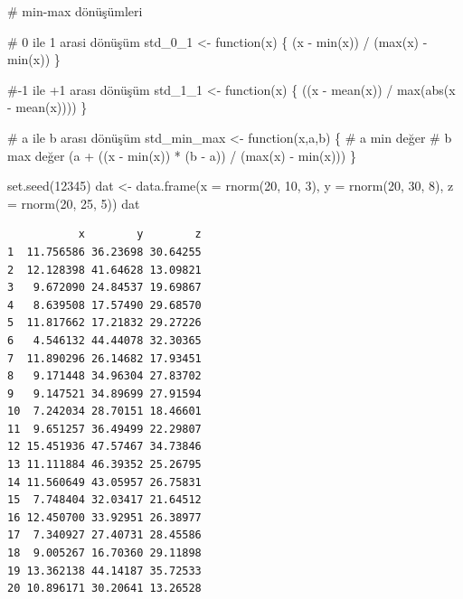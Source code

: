 \documentclass[
  letterpaper,
  DIV=11,
  numbers=noendperiod]{scrreprt}
\newenvironment{Shaded}{\begin{snugshade}}{\end{snugshade}}
\newcommand{\AttributeTok}[1]{\textcolor[rgb]{0.40,0.45,0.13}{#1}}
\newcommand{\CommentTok}[1]{\textcolor[rgb]{0.37,0.37,0.37}{#1}}
\newcommand{\ControlFlowTok}[1]{\textcolor[rgb]{0.00,0.23,0.31}{#1}}
\newcommand{\DecValTok}[1]{\textcolor[rgb]{0.68,0.00,0.00}{#1}}
\newcommand{\FunctionTok}[1]{\textcolor[rgb]{0.28,0.35,0.67}{#1}}
\newcommand{\NormalTok}[1]{\textcolor[rgb]{0.00,0.23,0.31}{#1}}
\newcommand{\OtherTok}[1]{\textcolor[rgb]{0.00,0.23,0.31}{#1}}
\newcommand{\SpecialCharTok}[1]{\textcolor[rgb]{0.37,0.37,0.37}{#1}}
\begin{document}
\begin{Shaded}
\begin{Highlighting}[]
\CommentTok{\# min{-}max dönüşümleri}

\CommentTok{\# 0 ile 1 arasi dönüşüm}
\NormalTok{std\_0\_1 }\OtherTok{\textless{}{-}} \ControlFlowTok{function}\NormalTok{(x) \{}
\NormalTok{  (x }\SpecialCharTok{{-}} \FunctionTok{min}\NormalTok{(x)) }\SpecialCharTok{/}\NormalTok{ (}\FunctionTok{max}\NormalTok{(x) }\SpecialCharTok{{-}} \FunctionTok{min}\NormalTok{(x))}
\NormalTok{\}}

\CommentTok{\#{-}1 ile +1 arası dönüşüm }
\NormalTok{std\_1\_1 }\OtherTok{\textless{}{-}} \ControlFlowTok{function}\NormalTok{(x) \{}
\NormalTok{  ((x }\SpecialCharTok{{-}} \FunctionTok{mean}\NormalTok{(x)) }\SpecialCharTok{/} \FunctionTok{max}\NormalTok{(}\FunctionTok{abs}\NormalTok{(x }\SpecialCharTok{{-}} \FunctionTok{mean}\NormalTok{(x))))}
\NormalTok{\}}

\CommentTok{\# a ile b arası dönüşüm }
\NormalTok{std\_min\_max }\OtherTok{\textless{}{-}} \ControlFlowTok{function}\NormalTok{(x,a,b) \{}
  \CommentTok{\# a min değer}
  \CommentTok{\# b max değer}
\NormalTok{  (a }\SpecialCharTok{+}\NormalTok{ ((x }\SpecialCharTok{{-}} \FunctionTok{min}\NormalTok{(x)) }\SpecialCharTok{*}\NormalTok{ (b }\SpecialCharTok{{-}}\NormalTok{ a)) }\SpecialCharTok{/}\NormalTok{ (}\FunctionTok{max}\NormalTok{(x) }\SpecialCharTok{{-}} \FunctionTok{min}\NormalTok{(x)))}
\NormalTok{\}}

\FunctionTok{set.seed}\NormalTok{(}\DecValTok{12345}\NormalTok{)}
\NormalTok{dat }\OtherTok{\textless{}{-}} \FunctionTok{data.frame}\NormalTok{(}\AttributeTok{x =} \FunctionTok{rnorm}\NormalTok{(}\DecValTok{20}\NormalTok{, }\DecValTok{10}\NormalTok{, }\DecValTok{3}\NormalTok{),}
                  \AttributeTok{y =} \FunctionTok{rnorm}\NormalTok{(}\DecValTok{20}\NormalTok{, }\DecValTok{30}\NormalTok{, }\DecValTok{8}\NormalTok{),}
                  \AttributeTok{z =} \FunctionTok{rnorm}\NormalTok{(}\DecValTok{20}\NormalTok{, }\DecValTok{25}\NormalTok{, }\DecValTok{5}\NormalTok{))}
\NormalTok{dat}
\end{Highlighting}
\end{Shaded}

\begin{verbatim}
           x        y        z
1  11.756586 36.23698 30.64255
2  12.128398 41.64628 13.09821
3   9.672090 24.84537 19.69867
4   8.639508 17.57490 29.68570
5  11.817662 17.21832 29.27226
6   4.546132 44.44078 32.30365
7  11.890296 26.14682 17.93451
8   9.171448 34.96304 27.83702
9   9.147521 34.89699 27.91594
10  7.242034 28.70151 18.46601
11  9.651257 36.49499 22.29807
12 15.451936 47.57467 34.73846
13 11.111884 46.39352 25.26795
14 11.560649 43.05957 26.75831
15  7.748404 32.03417 21.64512
16 12.450700 33.92951 26.38977
17  7.340927 27.40731 28.45586
18  9.005267 16.70360 29.11898
19 13.362138 44.14187 35.72533
20 10.896171 30.20641 13.26528
\end{verbatim}
\end{document}
